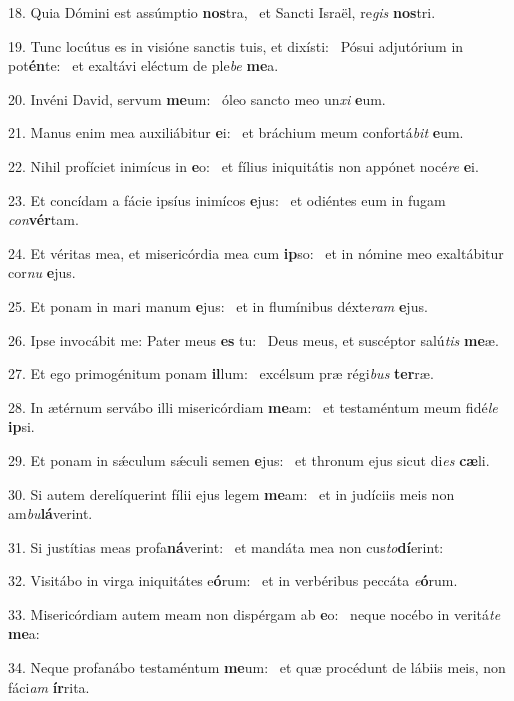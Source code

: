 18. Quia Dómini est assúmptio \textbf{nos}tra, \ast\  et Sancti Israël, re\textit{gis} \textbf{nos}tri.\

19. Tunc locútus es in visióne sanctis tuis, et dixísti: \dag\  Pósui adjutórium in pot\textbf{én}te: \ast\  et exaltávi eléctum de ple\textit{be} \textbf{me}a.\

20. Invéni David, servum \textbf{me}um: \ast\  óleo sancto meo un\textit{xi} \textbf{e}um.\

21. Manus enim mea auxiliábitur \textbf{e}i: \ast\  et bráchium meum confortá\textit{bit} \textbf{e}um.\

22. Nihil profíciet inimícus in \textbf{e}o: \ast\  et fílius iniquitátis non appónet nocé\textit{re} \textbf{e}i.\

23. Et concídam a fácie ipsíus inimícos \textbf{e}jus: \ast\  et odiéntes eum in fugam \textit{con}\textbf{vér}tam.\

24. Et véritas mea, et misericórdia mea cum \textbf{ip}so: \ast\  et in nómine meo exaltábitur cor\textit{nu} \textbf{e}jus.\

25. Et ponam in mari manum \textbf{e}jus: \ast\  et in flumínibus déxte\textit{ram} \textbf{e}jus.\

26. Ipse invocábit me: Pater meus \textbf{es} tu: \ast\  Deus meus, et suscéptor salú\textit{tis} \textbf{me}æ.\

27. Et ego primogénitum ponam \textbf{il}lum: \ast\  excélsum præ régi\textit{bus} \textbf{ter}ræ.\

28. In ætérnum servábo illi misericórdiam \textbf{me}am: \ast\  et testaméntum meum fidé\textit{le} \textbf{ip}si.\

29. Et ponam in sǽculum sǽculi semen \textbf{e}jus: \ast\  et thronum ejus sicut di\textit{es} \textbf{cæ}li.\

30. Si autem derelíquerint fílii ejus legem \textbf{me}am: \ast\  et in judíciis meis non am\textit{bu}\textbf{lá}verint.\

31. Si justítias meas profa\textbf{ná}verint: \ast\  et mandáta mea non cus\textit{to}\textbf{dí}erint:\

32. Visitábo in virga iniquitátes e\textbf{ó}rum: \ast\  et in verbéribus peccáta \textit{e}\textbf{ó}rum.\

33. Misericórdiam autem meam non dispérgam ab \textbf{e}o: \ast\  neque nocébo in veritá\textit{te} \textbf{me}a:\

34. Neque profanábo testaméntum \textbf{me}um: \ast\  et quæ procédunt de lábiis meis, non fáci\textit{am} \textbf{ír}rita.\

